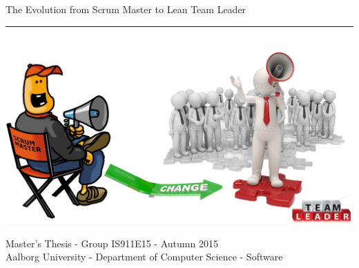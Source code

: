 \thispagestyle{empty}
\begin{flushright}
\vspace{3cm}

\phantom{hul}

\phantom{hul}

\phantom{hul}

\begin{center}
	\Huge{The Evolution from Scrum Master to Lean Team Leader}
\end{center}
\vspace{1cm}

\rule{1\textwidth}{3mm} \\ \vspace{1.5cm}
\includegraphics[width=\textwidth]{Images/ScrumMasterToTeamLeader.png}
\vspace{1.5cm} \\
\vfill
\begin{center}
\Large{
Master's Thesis \hspace{0.5mm} - \hspace{0.5mm} Group IS911E15 \hspace{0.5mm} - \hspace{0.5mm} Autumn 2015\\
Aalborg University \hspace{0.5mm} - \hspace{0.5mm} Department of Computer Science \hspace{0.5mm} - \hspace{0.5mm} Software\\
~\\
}
\end{center}

\end{flushright}
